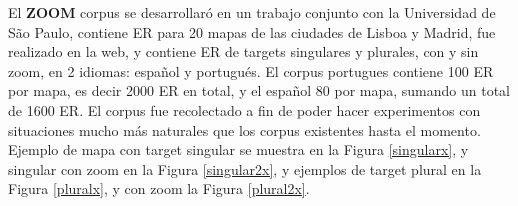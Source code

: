 \label{sec:corpusZOOM}
El {\bf ZOOM} corpus se desarrollar\'o en un trabajo conjunto con la Universidad de S\~ao Paulo, contiene ER para 20 mapas de las ciudades de Lisboa y Madrid, fue realizado en la web, y contiene ER de targets singulares y plurales, con y sin zoom, en 2 idiomas: espa\~nol y portugu\'es. El corpus portugues contiene 100 ER por mapa, es decir 2000 ER en total, y el espa\~nol 80 por mapa, sumando un total de 1600 ER. El corpus fue recolectado a fin de poder hacer experimentos con situaciones mucho m\'as naturales que los corpus existentes hasta el momento. Ejemplo de mapa con target singular se muestra en la Figura \ref{singularx}, y singular con zoom en la Figura \ref{singular2x}, y ejemplos de target plural en la Figura \ref{pluralx}, y con zoom la Figura \ref{plural2x}.




